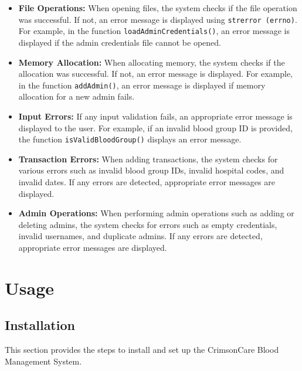 \documentclass[12pt,a4paper]{report}
\begin{document}
\begin{itemize}
    \item \textbf{File Operations:} When opening files, the system checks if the file operation was successful. If not, an error message is displayed using \texttt{strerror (errno)}. For example, in the function \texttt{loadAdminCredentials()}, an error message is displayed if the admin credentials file cannot be opened.
    \item \textbf{Memory Allocation:} When allocating memory, the system checks if the allocation was successful. If not, an error message is displayed. For example, in the function \texttt{addAdmin()}, an error message is displayed if memory allocation for a new admin fails.
    \item \textbf{Input Errors:} If any input validation fails, an appropriate error message is displayed to the user. For example, if an invalid blood group ID is provided, the function \texttt{isValidBloodGroup()} displays an error message.
    \item \textbf{Transaction Errors:} When adding transactions, the system checks for various errors such as invalid blood group IDs, invalid hospital codes, and invalid dates. If any errors are detected, appropriate error messages are displayed.
    \item \textbf{Admin Operations:} When performing admin operations such as adding or deleting admins, the system checks for errors such as empty credentials, invalid usernames, and duplicate admins. If any errors are detected, appropriate error messages are displayed.
\end{itemize}

\chapter{Usage}
\section{Installation}
This section provides the steps to install and set up the CrimsonCare Blood Management System.
\end{document}
